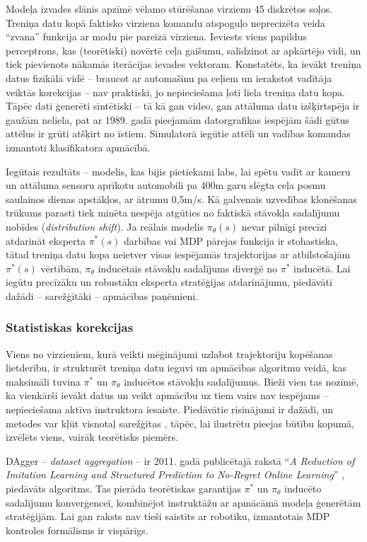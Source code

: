 \documentclass[12pt, a4paper]{article}
\numberwithin{equation}{section} %
\begin{document}
Modeļa izvades slānis apzīmē vēlamo stūrēšanas virzienu 45 diskrētos soļos. Treniņa datu kopā faktisko virziena komandu atspoguļo neprecizēta veida ``zvana'' funkcija ar modu pie pareizā virziena. Ieviests viens papildus perceptrons, kas (teorētiski) novērtē ceļa gaišumu, salīdzinot ar apkārtējo vidi, un tiek pievienots nākamās iterācijas ievades vektoram. Konstatēts, ka ievākt treniņa datus fizikālā vidē -- braucot ar automašīnu pa ceļiem un ierakstot vadītāja veiktās korekcijas -- nav praktiski, jo nepieciešama ļoti liela treniņa datu kopa. Tāpēc dati ģenerēti sintētiski -- tā kā gan video, gan attāluma datu izšķirtspēja ir gaužām neliela, pat ar 1989. gadā pieejamām datorgrafikas iespējām šādi gūtus attēlus ir grūti atšķirt no īstiem. Simulatorā iegūtie attēli un vadības komandas izmantoti klasifikatora apmācībā.

Iegūtais rezultāts -- modelis, kas bijis pietiekami labs, lai spētu vadīt ar kameru un attāluma sensoru aprīkotu automobili pa 400m garu slēgta ceļa posmu saulainos dienas apstākļos, ar ātrumu 0,5m/s. Kā galvenais uzvedības klonēšanas trūkums parasti tiek minēta nespēja atgūties no faktiskā stāvokļa sadalījumu nobīdes \cite{attia2018global} (\textit{distribution shift}). Ja reālais modelis $\pi_{\theta}(s)$ nevar pilnīgi precīzi atdarināt eksperta $\pi^*(s)$ darbības vai MDP pārejas funkcija ir stohastiska, tātad treniņa datu kopa neietver visas iespējamās trajektorijas ar atbilstošajām $\pi^*(s)$ vērtībām, $\pi_{\theta}$ inducētais stāvokļu sadalījums diverģē no $\pi^*$ inducētā. Lai iegūtu precīzāku un robustāku eksperta stratēģijas atdarinājumu, piedāvāti dažādi -- sarežģītāki -- apmācības paņēmieni.

\subsubsection{Statistiskas korekcijas}

Viens no virzieniem, kurā veikti mēģinājumi uzlabot trajektoriju kopēšanas lietderību, ir strukturēt treniņa datu ieguvi un apmācības algoritmu veidā, kas maksimāli tuvina $\pi^*$ un $\pi_{\theta}$ inducētos stāvokļu sadalījumus. Bieži vien tas nozīmē, ka vienkārši ievākt datus un veikt apmācību uz tiem vairs nav iespējams -- nepieciešama aktīva instruktora iesaiste. Piedāvātie risinājumi ir dažādi, un metodes var kļūt visnotaļ sarežģītas \cite{attia2018global}, tāpēc, lai ilustrētu pieejas būtību kopumā, izvēlēts viens, vairāk teorētisks piemērs.

DAgger -- \textit{dataset aggregation} -- ir 2011. gadā publicētajā rakstā ``\textit{A Reduction of Imitation Learning and Structured Prediction
to No-Regret Online Learning}'' \cite{ross2011no}, piedāvāts algoritms. Tas pierāda teorētiskas garantijas $\pi^*$ un $\pi_{\theta}$ inducēto sadalījumu konverģencei, kombinējot instruktāžu ar apmācāmā modeļa ģenerētām stratēģijām. Lai gan raksts nav tieši saistīts ar robotiku, izmantotais MDP kontroles formālisms ir vispārīgs.
\end{document}
